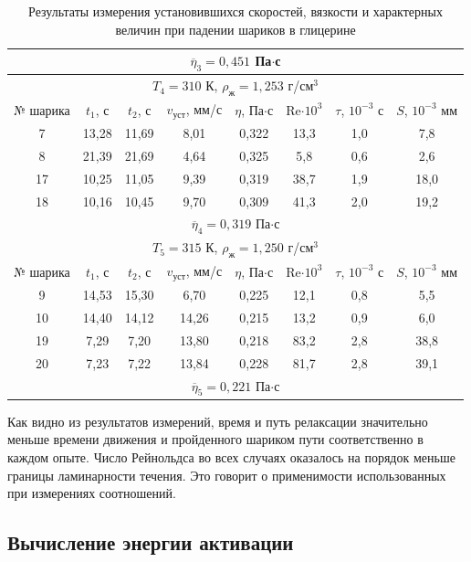 \documentclass[a4paper,12pt]{article} %
\begin{document}
\begin{table}[]
\begin{tabular}{|c|c|c|c|c|c|c|c|}
        \multicolumn{8}{|c|}{$\overline{\eta}_3 = 0,451$ Па$\cdot$с} \\ \hline
        \multicolumn{8}{|c|}{$T_4 = 310$ К, $\rho_\text{ж} = 1,253$ г/$\text{см}^3$} \\ \hline
        № шарика & $t_1$, с & $t_2$, с & $v_\text{уст}$, мм/с & $\eta$, Па$\cdot$с & Re$\cdot 10^3$ & $\tau$, $10^{-3}$ с & $S$, $10^{-3}$ мм  \\ \hline
        7 & 13,28 & 11,69 & 8,01 & 0,322 & 13,3 & 1,0 & 7,8 \\ \hline
        8 & 21,39 & 21,69 & 4,64 & 0,325 & 5,8 & 0,6 & 2,6 \\ \hline
        17 & 10,25 & 11,05 & 9,39 & 0,319 & 38,7 & 1,9 & 18,0 \\ \hline
        18 & 10,16 & 10,45 & 9,70 & 0,309 & 41,3 & 2,0 & 19,2 \\ \hline
        \multicolumn{8}{|c|}{$\overline{\eta}_4 = 0,319$ Па$\cdot$с} \\ \hline
        \multicolumn{8}{|c|}{$T_5 = 315$ К, $\rho_\text{ж} = 1,250$ г/$\text{см}^3$} \\ \hline
        № шарика & $t_1$, с & $t_2$, с & $v_\text{уст}$, мм/с & $\eta$, Па$\cdot$с & Re$\cdot 10^3$ & $\tau$, $10^{-3}$ с & $S$, $10^{-3}$ мм  \\ \hline
        9 & 14,53 & 15,30 & 6,70 & 0,225 & 12,1 & 0,8 & 5,5 \\ \hline
        10 & 14,40 & 14,12 & 14,26 & 0,215 & 13,2 & 0,9 & 6,0 \\ \hline
        19 & 7,29 & 7,20 & 13,80 & 0,218 & 83,2 & 2,8 & 38,8 \\ \hline
        20 & 7,23 & 7,22 & 13,84 & 0,228 & 81,7 & 2,8 & 39,1 \\ \hline
        \multicolumn{8}{|c|}{$\overline{\eta}_5 = 0,221$ Па$\cdot$с} \\ \hline
    \end{tabular}
    \caption{Результаты измерения установившихся скоростей, вязкости и характерных величин при падении шариков в глицерине}
    \label{tab:results}
\end{table}

Как видно из результатов измерений, время и путь релаксации значительно меньше времени движения и пройденного шариком пути соответственно в каждом опыте. Число Рейнольдса во всех случаях оказалось на порядок меньше границы ламинарности течения. Это говорит о применимости использованных при измерениях соотношений.

\subsection{Вычисление энергии активации}
\end{document}
